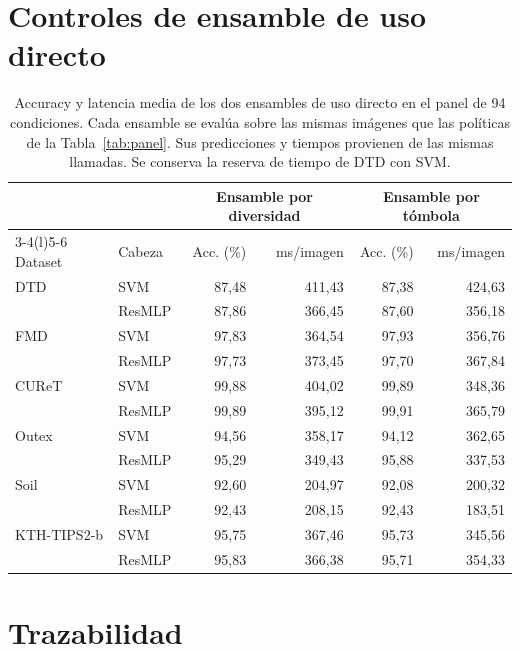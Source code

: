 \documentclass[a4paper,fleqn]{cas-sc}
\begin{document}
\FloatBarrier

\section{Controles de ensamble de uso directo}

\begin{table}[pos=htbp]
\centering
\caption{Accuracy y latencia media de los dos ensambles de uso directo en el panel de 94 condiciones. Cada ensamble se evalúa sobre las mismas imágenes que las políticas de la Tabla~\ref{tab:panel}. Sus predicciones y tiempos provienen de las mismas llamadas. Se conserva la reserva de tiempo de DTD con SVM.}
\label{tab:panel-ensembles}
\small
\begin{tabular}{@{}llrrrr@{}}
\toprule
 & & \multicolumn{2}{c}{Ensamble por diversidad} & \multicolumn{2}{c}{Ensamble por tómbola} \\
\cmidrule(lr){3-4}\cmidrule(l){5-6}
Dataset & Cabeza & Acc. (\%) & ms/imagen & Acc. (\%) & ms/imagen \\
\midrule
DTD & SVM & 87,48 & 411,43 & 87,38 & 424,63 \\
 & ResMLP & 87,86 & 366,45 & 87,60 & 356,18 \\
FMD & SVM & 97,83 & 364,54 & 97,93 & 356,76 \\
 & ResMLP & 97,73 & 373,45 & 97,70 & 367,84 \\
CUReT & SVM & 99,88 & 404,02 & 99,89 & 348,36 \\
 & ResMLP & 99,89 & 395,12 & 99,91 & 365,79 \\
Outex & SVM & 94,56 & 358,17 & 94,12 & 362,65 \\
 & ResMLP & 95,29 & 349,43 & 95,88 & 337,53 \\
Soil & SVM & 92,60 & 204,97 & 92,08 & 200,32 \\
 & ResMLP & 92,43 & 208,15 & 92,43 & 183,51 \\
KTH-TIPS2-b & SVM & 95,75 & 367,46 & 95,73 & 345,56 \\
 & ResMLP & 95,83 & 366,38 & 95,71 & 354,33 \\
\bottomrule
\end{tabular}
\end{table}
\FloatBarrier

\section{Trazabilidad}
\end{document}

